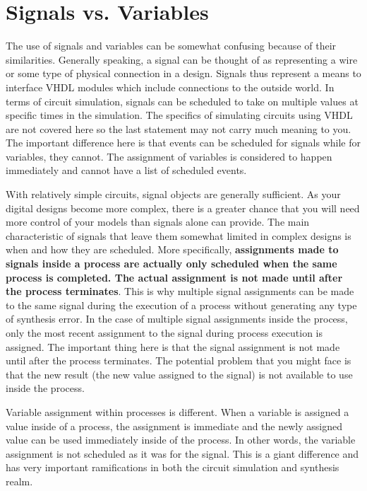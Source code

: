 \section{Signals vs. Variables}
The use of signals and variables can be somewhat confusing because of their similarities. Generally speaking, a signal can be thought of as representing a wire or some type of physical connection in a design. Signals thus represent a means to interface VHDL modules which include connections to the outside world. In terms of circuit simulation, signals can be scheduled to take on multiple values at specific times in the simulation. The specifics of simulating circuits using VHDL are not covered here so the last statement may not carry much meaning to you. The important difference here is that events can be scheduled for signals while for variables, they cannot. The assignment of variables is considered to happen immediately and cannot have a list of scheduled events.

With relatively simple circuits, signal objects are generally sufficient. As your digital designs become more complex, there is a greater chance that you will need more control of your models than signals alone can provide. The main characteristic of signals that leave them somewhat limited in complex designs is when and how they are scheduled. More specifically, \textbf{assignments made to signals inside a process are actually only scheduled when the same process is completed. The actual assignment is not made until after the process terminates}. This is why multiple signal assignments can be made to the same signal during the execution of a process without generating any type of synthesis error. In the case of multiple signal assignments inside the process, only the most recent assignment to the signal during process execution is assigned. The important thing here is that the signal assignment is not made until after the process terminates. The potential problem that you might face is that the new result (the new value assigned to the signal) is not available to use inside the process. 

Variable assignment within processes is different. When a variable is assigned a value inside of a process, the assignment is immediate and the newly assigned value can be used immediately inside of the process. In other words, the variable assignment is not scheduled as it was for the signal. This is a giant difference and has very important ramifications in both the circuit simulation and synthesis realm. 

